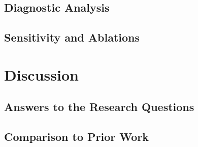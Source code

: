 \documentclass[11pt,a4paper,oneside]{report}
\begin{document}

\section{Diagnostic Analysis}
\label{sec:diagnosis}

\section{Sensitivity and Ablations}

\chapter{Discussion}
\label{ch:discussion}

\section{Answers to the Research Questions}

\section{Comparison to Prior Work}
\end{document}
